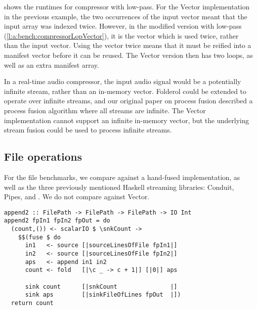  shows the runtimes for compressor with low-pass.
For the Vector implementation in the previous example, the two occurrences of the input vector meant that the input array was indexed twice.
However, in the modified version with low-pass (\cref{l:a:bench:compressorLopVector}), it is the \Hs@lopass@ vector which is used twice, rather than the input vector.
Using the \Hs@lopass@ vector twice means that it must be reified into a manifest vector before it can be reused.
The Vector version then has two loops, as well as an extra manifest array.

In a real-time audio compressor, the input audio signal would be a potentially infinite stream, rather than an in-memory vector.
Folderol could be extended to operate over infinite streams, and our original paper on process fusion \citep{robinson2017machine} described a process fusion algorithm where all streams are infinite.
The Vector implementation cannot support an infinite in-memory vector, but the underlying stream fusion \citep{coutts2007stream} could be used to process infinite streams.


\subsection{File operations}
For the file benchmarks, we compare against a hand-fused implementation, as well as the three previously mentioned Haskell streaming libraries: Conduit, Pipes, and \Streaming.
We do not compare against Vector.

\begin{lstlisting}[float,label=l:bench:append2Folderol,caption=Folderol implementation of \Hs/append2/]
append2 :: FilePath -> FilePath -> FilePath -> IO Int
append2 fpIn1 fpIn2 fpOut = do
  (count,()) <- scalarIO $ \snkCount ->
    $$(fuse $ do
      in1   <- source [|sourceLinesOfFile fpIn1|]
      in2   <- source [|sourceLinesOfFile fpIn2|]
      aps   <- append in1 in2
      count <- fold   [|\c _ -> c + 1|] [|0|] aps

      sink count      [|snkCount               |]
      sink aps        [|sinkFileOfLines fpOut  |])
  return count
\end{lstlisting}

